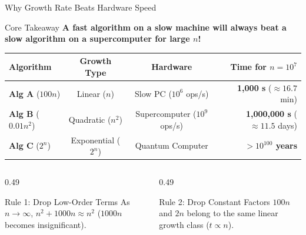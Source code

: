 \documentclass[aspectratio=169]{beamer}
\begin{document}
\begin{frame}{Why Growth Rate Beats Hardware Speed}
  \begin{alertblock}{Core Takeaway}
    \centering\small
    \textbf{A fast algorithm on a slow machine will always beat a slow algorithm on a supercomputer for large $n$!}
  \end{alertblock}

  \vspace{0.2em}
  \begin{center}
    \footnotesize
    \begin{tabular}{l c c r}
      \toprule
      \textbf{Algorithm} & \textbf{Growth Type} & \textbf{Hardware} & \textbf{Time for $n = 10^7$} \\
      \midrule
      \textbf{Alg A} ($100 n$) & Linear ($n$) & Slow PC ($10^6$ ops/s) & \textbf{1,000 s} ($\approx 16.7$ min) \\
      \textbf{Alg B} ($0.01 n^2$) & Quadratic ($n^2$) & Supercomputer ($10^9$ ops/s) & \textbf{1,000,000 s} ($\approx 11.5$ days) \\
      \textbf{Alg C} ($2^n$) & Exponential ($2^n$) & Quantum Computer & \textbf{$> 10^{100}$ years} \\
      \bottomrule
    \end{tabular}
  \end{center}

  \vspace{0.2em}
  \begin{columns}[T]
    \begin{column}{0.49\textwidth}
      \begin{block}{Rule 1: Drop Low-Order Terms}
        \scriptsize As $n \to \infty$, $n^2 + 1000n \approx n^2$ ($1000n$ becomes insignificant).
      \end{block}
    \end{column}
    \begin{column}{0.49\textwidth}
      \begin{block}{Rule 2: Drop Constant Factors}
        \scriptsize $100n$ and $2n$ belong to the same linear growth class ($t \propto n$).
      \end{block}
    \end{column}
  \end{columns}
\end{frame}
\end{document}
